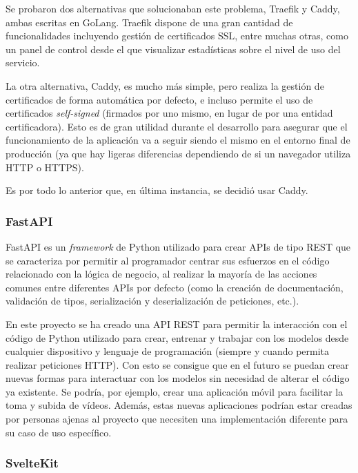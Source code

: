Se probaron dos alternativas que solucionaban este problema, Traefik y Caddy,
ambas escritas en GoLang. Traefik dispone de una gran cantidad de
funcionalidades incluyendo gestión de certificados SSL, entre muchas otras, como
un panel de control desde el que visualizar estadísticas sobre el nivel de uso
del servicio.

La otra alternativa, Caddy, es mucho más simple, pero realiza la gestión de
certificados de forma automática por defecto, e incluso permite el uso de
certificados \textit{self-signed} (firmados por uno mismo, en lugar de por una
entidad certificadora). Esto es de gran utilidad durante el desarrollo para
asegurar que el funcionamiento de la aplicación va a seguir siendo el mismo en
el entorno final de producción (ya que hay ligeras diferencias dependiendo de si
un navegador utiliza HTTP o HTTPS).

Es por todo lo anterior que, en última instancia, se decidió usar Caddy.

\subsubsection{FastAPI}

FastAPI es un \textit{framework} de Python utilizado para crear APIs de tipo
REST que se caracteriza por permitir al programador centrar sus esfuerzos en el
código relacionado con la lógica de negocio, al realizar la mayoría de las
acciones comunes entre diferentes APIs por defecto (como la creación de
documentación, validación de tipos, serialización y deserialización de
peticiones, etc.).

En este proyecto se ha creado una API REST para permitir la interacción con el
código de Python utilizado para crear, entrenar y trabajar con los modelos desde
cualquier dispositivo y lenguaje de programación (siempre y cuando permita
realizar peticiones HTTP). Con esto se consigue que en el futuro se puedan crear
nuevas formas para interactuar con los modelos sin necesidad de alterar el
código ya existente. Se podría, por ejemplo, crear una aplicación móvil para
facilitar la toma y subida de vídeos. Además, estas nuevas aplicaciones podrían
estar creadas por personas ajenas al proyecto que necesiten una implementación
diferente para su caso de uso específico.

\subsubsection{SvelteKit}

